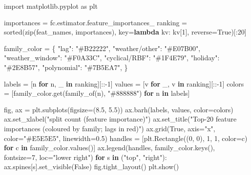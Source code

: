 \documentclass[
  english,
  letterpaper,
]{scrbook}
\newenvironment{Shaded}{\begin{snugshade}}{\end{snugshade}}
\newcommand{\BuiltInTok}[1]{\textcolor[rgb]{0.00,0.23,0.31}{#1}}
\newcommand{\ControlFlowTok}[1]{\textcolor[rgb]{0.00,0.23,0.31}{\textbf{#1}}}
\newcommand{\DecValTok}[1]{\textcolor[rgb]{0.68,0.00,0.00}{#1}}
\newcommand{\FloatTok}[1]{\textcolor[rgb]{0.68,0.00,0.00}{#1}}
\newcommand{\ImportTok}[1]{\textcolor[rgb]{0.00,0.46,0.62}{#1}}
\newcommand{\KeywordTok}[1]{\textcolor[rgb]{0.00,0.23,0.31}{\textbf{#1}}}
\newcommand{\NormalTok}[1]{\textcolor[rgb]{0.00,0.23,0.31}{#1}}
\newcommand{\OperatorTok}[1]{\textcolor[rgb]{0.37,0.37,0.37}{#1}}
\newcommand{\StringTok}[1]{\textcolor[rgb]{0.13,0.47,0.30}{#1}}
\newcommand{\VariableTok}[1]{\textcolor[rgb]{0.07,0.07,0.07}{#1}}
\begin{document}
\begin{Shaded}
\begin{Highlighting}[]
\ImportTok{import}\NormalTok{ matplotlib.pyplot }\ImportTok{as}\NormalTok{ plt}

\NormalTok{importances }\OperatorTok{=}\NormalTok{ fc.estimator.feature\_importances\_}
\NormalTok{ranking }\OperatorTok{=} \BuiltInTok{sorted}\NormalTok{(}\BuiltInTok{zip}\NormalTok{(feat\_names, importances), key}\OperatorTok{=}\KeywordTok{lambda}\NormalTok{ kv: kv[}\DecValTok{1}\NormalTok{], reverse}\OperatorTok{=}\VariableTok{True}\NormalTok{)[:}\DecValTok{20}\NormalTok{]}

\NormalTok{family\_color }\OperatorTok{=}\NormalTok{ \{}
    \StringTok{"lag"}\NormalTok{:            }\StringTok{"\#B22222"}\NormalTok{,}
    \StringTok{"weather/other"}\NormalTok{:  }\StringTok{"\#E07B00"}\NormalTok{,}
    \StringTok{"weather\_window"}\NormalTok{: }\StringTok{"\#F0A33C"}\NormalTok{,}
    \StringTok{"cyclical/RBF"}\NormalTok{:   }\StringTok{"\#1F4E79"}\NormalTok{,}
    \StringTok{"holiday"}\NormalTok{:        }\StringTok{"\#2E8B57"}\NormalTok{,}
    \StringTok{"polynomial"}\NormalTok{:     }\StringTok{"\#7B5EA7"}\NormalTok{,}
\NormalTok{\}}

\NormalTok{labels }\OperatorTok{=}\NormalTok{ [n }\ControlFlowTok{for}\NormalTok{ n, \_ }\KeywordTok{in}\NormalTok{ ranking][::}\OperatorTok{{-}}\DecValTok{1}\NormalTok{]}
\NormalTok{values }\OperatorTok{=}\NormalTok{ [v }\ControlFlowTok{for}\NormalTok{ \_, v }\KeywordTok{in}\NormalTok{ ranking][::}\OperatorTok{{-}}\DecValTok{1}\NormalTok{]}
\NormalTok{colors }\OperatorTok{=}\NormalTok{ [family\_color.get(family\_of(n), }\StringTok{"\#888888"}\NormalTok{) }\ControlFlowTok{for}\NormalTok{ n }\KeywordTok{in}\NormalTok{ labels]}

\NormalTok{fig, ax }\OperatorTok{=}\NormalTok{ plt.subplots(figsize}\OperatorTok{=}\NormalTok{(}\FloatTok{8.5}\NormalTok{, }\FloatTok{5.5}\NormalTok{))}
\NormalTok{ax.barh(labels, values, color}\OperatorTok{=}\NormalTok{colors)}
\NormalTok{ax.set\_xlabel(}\StringTok{"split count (feature importance)"}\NormalTok{)}
\NormalTok{ax.set\_title(}\StringTok{"Top{-}20 feature importances (coloured by family; lags in red)"}\NormalTok{)}
\NormalTok{ax.grid(}\VariableTok{True}\NormalTok{, axis}\OperatorTok{=}\StringTok{"x"}\NormalTok{, color}\OperatorTok{=}\StringTok{"\#E5E5E5"}\NormalTok{, linewidth}\OperatorTok{=}\FloatTok{0.5}\NormalTok{)}
\NormalTok{handles }\OperatorTok{=}\NormalTok{ [plt.Rectangle((}\DecValTok{0}\NormalTok{, }\DecValTok{0}\NormalTok{), }\DecValTok{1}\NormalTok{, }\DecValTok{1}\NormalTok{, color}\OperatorTok{=}\NormalTok{c) }\ControlFlowTok{for}\NormalTok{ c }\KeywordTok{in}\NormalTok{ family\_color.values()]}
\NormalTok{ax.legend(handles, family\_color.keys(), fontsize}\OperatorTok{=}\DecValTok{7}\NormalTok{, loc}\OperatorTok{=}\StringTok{"lower right"}\NormalTok{)}
\ControlFlowTok{for}\NormalTok{ s }\KeywordTok{in}\NormalTok{ (}\StringTok{"top"}\NormalTok{, }\StringTok{"right"}\NormalTok{):}
\NormalTok{    ax.spines[s].set\_visible(}\VariableTok{False}\NormalTok{)}
\NormalTok{fig.tight\_layout()}
\NormalTok{plt.show()}
\end{Highlighting}
\end{Shaded}
\end{document}
